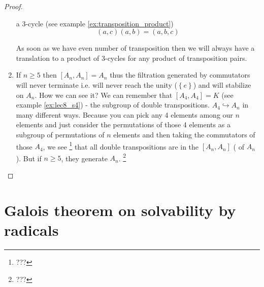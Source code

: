 \begin{theorem}[$S_n$ solvability]
\begin{proof}
\begin{enumerate}
{\begin{enumerate}
              a 3-cycle (see example \ref{ex:transposition_product})
              \[
              (a,c)(a,b) = (a,b,c)
              \]
          \end{enumerate}
          As soon as we have even number of transposition then we will
          always have a translation to a product of 3-cycles for any
          product of transposition pairs.
        }
      \item If $n \ge 5$ then $\left[A_n, A_n\right] = A_n$ thus the
        filtration generated by commutators will never terminate
        i.e. will never reach the unity ($\left\{e\right\}$) and will
        stabilize on $A_n$. How we can see it? We can remember that
        $\left[A_4, A_4\right] = K$ (see example \ref{ex:lec8_s4}) -
        the subgroup of double transpositions. $A_4 \hookrightarrow
        A_n$ in many different ways. Because you can pick any 4
        elements among our $n$ elements and just consider the
        permutations of 
        those 4 elements as a subgroup of permutations of $n$
        elements and then taking the commutators of those $A_4$, we
        see
        \footnote{
          ???
        }
        that all double transpositions are in the $\left[A_n,
          A_n\right]$ ( of $A_n$). But
        if $n \ge 5$, they generate $A_n$.
        \footnote{
          ???
        }
    \end{enumerate}
  \end{proof}
  \label{thm:lec8_sn_solvability}
\end{theorem}

\section{Galois theorem on solvability by radicals}

